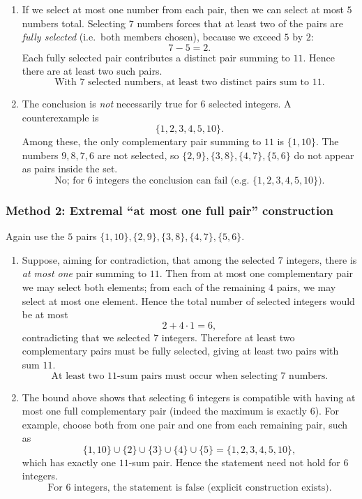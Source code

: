 \documentclass[12pt]{article}
\begin{document}
\begin{enumerate}[label=(\alph*)]
\item If we select at most one number from each pair, then we can select at most $5$ numbers total. Selecting $7$ numbers forces that at least two of the pairs are \emph{fully selected} (i.e.\ both members chosen), because we exceed $5$ by $2$:
\[
7-5=2.
\]
Each fully selected pair contributes a distinct pair summing to $11$. Hence there are at least two such pairs.
\[
\boxed{\text{With }7\text{ selected numbers, at least two distinct pairs sum to }11.}
\]

\item The conclusion is \emph{not} necessarily true for $6$ selected integers. A counterexample is
\[
\{1,2,3,4,5,10\}.
\]
Among these, the only complementary pair summing to $11$ is $\{1,10\}$. The numbers $9,8,7,6$ are not selected, so $\{2,9\},\{3,8\},\{4,7\},\{5,6\}$ do not appear as pairs inside the set.
\[
\boxed{\text{No; for }6\text{ integers the conclusion can fail (e.g.\ }\{1,2,3,4,5,10\}\text{).}}
\]
\end{enumerate}

\subsubsection{Method 2: Extremal ``at most one full pair'' construction}
Again use the $5$ pairs $\{1,10\},\{2,9\},\{3,8\},\{4,7\},\{5,6\}$.

\begin{enumerate}[label=(\alph*)]
\item Suppose, aiming for contradiction, that among the selected $7$ integers, there is \emph{at most one} pair summing to $11$. Then from at most one complementary pair we may select both elements; from each of the remaining $4$ pairs, we may select at most one element. Hence the total number of selected integers would be at most
\[
2 + 4\cdot 1 = 6,
\]
contradicting that we selected $7$ integers. Therefore at least two complementary pairs must be fully selected, giving at least two pairs with sum $11$.
\[
\boxed{\text{At least two }11\text{-sum pairs must occur when selecting }7\text{ numbers.}}
\]

\item The bound above shows that selecting $6$ integers is compatible with having at most one full complementary pair (indeed the maximum is exactly $6$). For example, choose both from one pair and one from each remaining pair, such as
\[
\{1,10\}\cup\{2\}\cup\{3\}\cup\{4\}\cup\{5\}=\{1,2,3,4,5,10\},
\]
which has exactly one $11$-sum pair. Hence the statement need not hold for $6$ integers.
\[
\boxed{\text{For }6\text{ integers, the statement is false (explicit construction exists).}}
\]
\end{enumerate}
\end{document}
